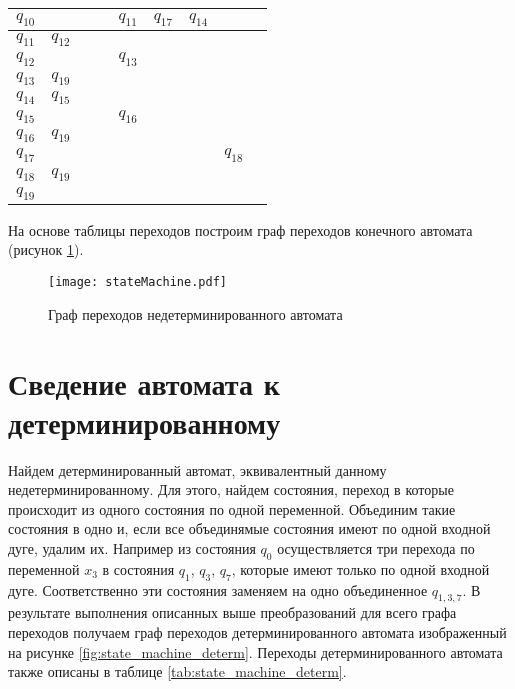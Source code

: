 \documentclass[a4paper,14pt,russian]{extarticle} %
\begin{document}
\begin{table}[H]
\begin{threeparttable}
\begin{tabular}{| l | c |c |c |c |c |c |c |c |}
			\({q_{10}}\) & \(\) & \(\) & \(\) & \({q_{11}}\) & \({q_{17}}\) & \({q_{14}}\) & \(\) & \(\) \\ \hline
			\({q_{11}}\) & \({q_{12}}\) & \(\) & \(\) & \(\) & \(\) & \(\) & \(\) & \(\) \\ \hline
			\({q_{12}}\) & \(\) & \(\) & \(\) & \({q_{13}}\) & \(\) & \(\) & \(\) & \(\) \\ \hline
			\({q_{13}}\) & \({q_{19}}\) & \(\) & \(\) & \(\) & \(\) & \(\) & \(\) & \(\) \\ \hline
			\({q_{14}}\) & \({q_{15}}\) & \(\) & \(\) & \(\) & \(\) & \(\) & \(\) & \(\) \\ \hline
			\({q_{15}}\) & \(\) & \(\) & \(\) & \({q_{16}}\) & \(\) & \(\) & \(\) & \(\) \\ \hline
			\({q_{16}}\) & \({q_{19}}\) & \(\) & \(\) & \(\) & \(\) & \(\) & \(\) & \(\) \\ \hline
			\({q_{17}}\) & \(\) & \(\) & \(\) & \(\) & \(\) & \(\) & \({q_{18}}\) & \(\) \\ \hline
			\({q_{18}}\) & \({q_{19}}\) & \(\) & \(\) & \(\) & \(\) & \(\) & \(\) & \(\) \\ \hline
			\({q_{19}}\) & \(\) & \(\) & \(\) & \(\) & \(\) & \(\) & \(\) & \(\) \\ \hline
		\end{tabular}		
\end{threeparttable}
\end{table}	

\newpage

На основе таблицы переходов построим граф переходов конечного автомата (рисунок \ref{fig:state_machine}).
\begin{figure}[H]	
\centering
\texttt{[image: stateMachine.pdf]}
\caption{Граф переходов недетерминированного автомата}
\label{fig:state_machine}
\end{figure}

\section {Сведение автомата к детерминированному}
Найдем детерминированный автомат, эквивалентный данному недетерминированному. Для этого, найдем состояния, переход в которые происходит из одного состояния по одной переменной. Объединим такие состояния в одно и, если все объединямые состояния имеют по одной входной дуге, удалим их. Например из состояния \(q_0\) осуществляется три перехода по переменной \(x_3\) в состояния \(q_1\), \(q_3\), \(q_7\), которые имеют только по одной входной дуге. Соответственно эти состояния заменяем на одно объединенное \(q_{1,3,7}\). В результате выполнения описанных выше преобразований для всего графа переходов получаем граф переходов детерминированного автомата изображенный на рисунке \ref{fig:state_machine_determ}. Переходы детерминированного автомата также описаны в таблице \ref{tab:state_machine_determ}.    
\end{document}
